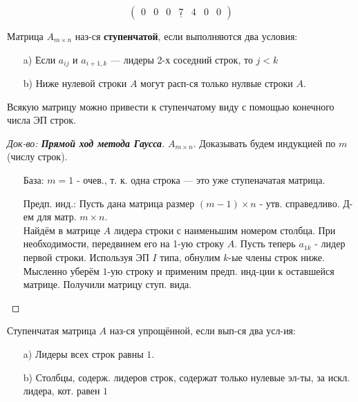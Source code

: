 \begin{example}
\[
  \begin{pmatrix}0 & 0 & 0 & \underline{7} & 4 & 0 & 0 \end{pmatrix}
\]
\end{example}
\begin{definition}
  Матрица $A_{m \times n}$ наз-ся \textbf{ступенчатой}, если выполняются два условия:
  \begin{itemize}
    \item [a) ] Если $a_{ij}$ и  $a_{i + 1, k}$ --- лидеры 2-х соседний строк, то $j < k$
    \item [b) ] Ниже нулевой строки $A$ могут расп-ся только нулвые строки $A$.
  \end{itemize}
\end{definition}
\begin{theorem}
  Всякую матрицу можно привести к ступенчатому виду с помощью конечного числа ЭП строк.
\end{theorem}
\begin{proof}[Док-во: \textbf{Прямой ход метода Гаусса}]
$A_{m \times n}$. Доказывать будем индукцией по $m$ (числу строк). 
\begin{itemize}
  \item [База: ] $m = 1$ - очев., т. к. одна строка --- это уже ступеначатая матрица.
  \item [Предп. инд.: ] Пусть дана матрица размер $(m - 1) \times n$ - утв. справедливо. Д-ем для матр. $m \times n$. \\
    
    Найдём в матрице $A$ лидера строки с наименьшим номером столбца. При необходимости, передвинем его на 1-ую строку $A$. Пусть теперь $a_{1k}$ - лидер первой строки. Используя ЭП $I$ типа, обнулим $k$-ые члены строк ниже. Мысленно уберём $1$-ую строку и применим предп. инд-ции к оставшейся матрице. Получили матрицу ступ. вида.
\end{itemize}
\end{proof}
\begin{definition}
Ступенчатая матрица $A$ наз-ся упрощённой, если вып-ся два усл-ия:
\begin{itemize}
  \item [a)] Лидеры всех строк равны $1$. \\
  \item [b) ] Столбцы, содерж. лидеров строк, содержат только нулевые эл-ты, за искл. лидера, кот. равен $1$
\end{itemize}
\end{definition}
